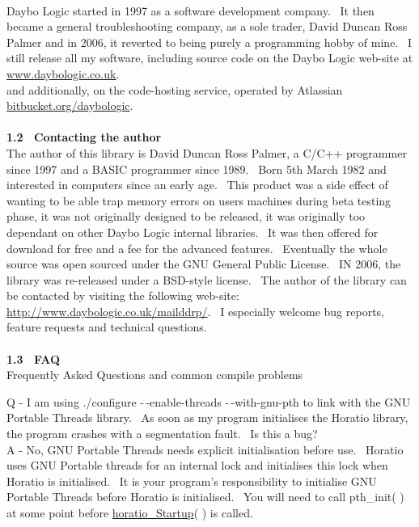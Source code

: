 \documentclass{article}
\begin{document}
\\
Daybo Logic started in 1997 as a software development company.~ It
then became a general troubleshooting company, as a sole trader, David
Duncan Ross Palmer and in 2006, it reverted to being purely a
programming hobby of mine.~ I still release all my software,
including source code on the Daybo Logic web-site at \href{http://www.daybologic.co.uk/}{www.daybologic.co.uk}.\\
and additionally, on the code-hosting service, operated by Atlassian
\href{https://bitbucket.org/daybologic}{bitbucket.org/daybologic}.\\
\\
\textbf{1.2~ Contacting the author}
\\
The author of this library is David Duncan Ross Palmer, a C/C++
programmer
since 1997 and a BASIC programmer since 1989.~ Born 5th March 1982
and interested in computers since an early age.~ This product was
a side effect of wanting to be able trap memory errors on users
machines
during beta testing phase, it was not originally designed to be
released,
it was originally too dependant on other Daybo Logic internal
libraries.~
It was then offered for download for free and a fee for the advanced
features.~
Eventually the whole source was open sourced under the GNU General
Public
License.~ IN 2006, the library was re-released under a BSD-style
license.~ The author of the library can be contacted by visiting
the following web-site: \href{http://www.daybologic.co.uk/mailddrp/}{\url{http://www.daybologic.co.uk/mailddrp/}}.~
I especially welcome bug reports, feature requests and technical
questions.\\
\\
\textbf{1.3~ FAQ}
\\
Frequently Asked Questions and common
compile problems
\par Q - I am using ./configure -$\,$-enable-threads -$\,$-with-gnu-pth to link
with the GNU Portable Threads library.~ As soon as my program
initialises the Horatio library, the program crashes with a
segmentation fault.~ Is this a bug?\\
A - No, GNU Portable Threads needs explicit initialisation before
use.~ Horatio uses GNU Portable threads for an internal lock and
initialises this lock when Horatio is initialised.~ It is your
program's responsibility to initialise GNU Portable Threads before
Horatio is initialised.~ You will need to call pth\_init( ) at
some point before \href{#Startup}{horatio\_Startup}( ) is called.\\
\end{document}

